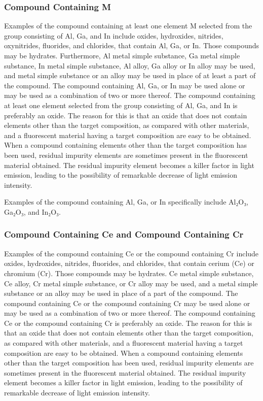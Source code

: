 \documentclass[11pt,a4paper]{article}
\begin{document}
\subsubsection{Compound Containing M}

Examples of the compound containing at least one element M selected from the group consisting of Al, Ga, and In include oxides, hydroxides, nitrides, oxynitrides, fluorides, and chlorides, that contain Al, Ga, or In. Those compounds may be hydrates. Furthermore, Al metal simple substance, Ga metal simple substance, In metal simple substance, Al alloy, Ga alloy or In alloy may be used, and metal simple substance or an alloy may be used in place of at least a part of the compound. The compound containing Al, Ga, or In may be used alone or may be used as a combination of two or more thereof. The compound containing at least one element selected from the group consisting of Al, Ga, and In is preferably an oxide. The reason for this is that an oxide that does not contain elements other than the target composition, as compared with other materials, and a fluorescent material having a target composition are easy to be obtained. When a compound containing elements other than the target composition has been used, residual impurity elements are sometimes present in the fluorescent material obtained. The residual impurity element becomes a killer factor in light emission, leading to the possibility of remarkable decrease of light emission intensity.

Examples of the compound containing Al, Ga, or In specifically include Al₂O₃, Ga₂O₃, and In₂O₃.

\subsubsection{Compound Containing Ce and Compound Containing Cr}

Examples of the compound containing Ce or the compound containing Cr include oxides, hydroxides, nitrides, fluorides, and chlorides, that contain cerium (Ce) or chromium (Cr). Those compounds may be hydrates. Ce metal simple substance, Ce alloy, Cr metal simple substance, or Cr alloy may be used, and a metal simple substance or an alloy may be used in place of a part of the compound. The compound containing Ce or the compound containing Cr may be used alone or may be used as a combination of two or more thereof. The compound containing Ce or the compound containing Cr is preferably an oxide. The reason for this is that an oxide that does not contain elements other than the target composition, as compared with other materials, and a fluorescent material having a target composition are easy to be obtained. When a compound containing elements other than the target composition has been used, residual impurity elements are sometimes present in the fluorescent material obtained. The residual impurity element becomes a killer factor in light emission, leading to the possibility of remarkable decrease of light emission intensity.
\end{document}
